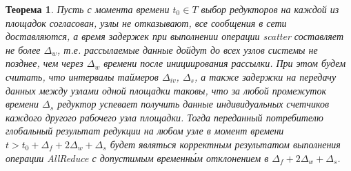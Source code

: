 \documentclass{article}
\theoremstyle{plain}
\newtheorem{theorem}{Теорема}[section]
\theoremstyle{plain}
\theoremstyle{plain}
\theoremstyle{plain}
\theoremstyle{definition}
\theoremstyle{remark}
\theoremstyle{plain}
\begin{document}
\begin{theorem}
\label{ConsistentStateCorrectness}
    Пусть с момента времени $t_0 \in T$ выбор редукторов на каждой из площадок согласован, узлы не отказывают, все сообщения в сети доставляются, а время задержек при выполнении операции scatter составляет не более $\Delta_w$, т.е. рассылаемые данные дойдут до всех узлов системы не позднее, чем через $\Delta_w$ времени после инициирования рассылки. При этом будем считать, что интервалы таймеров $\Delta_{iv}$, $\Delta_s$, а также задержки на передачу данных между узлами одной площадки таковы, что за любой промежуток времени $\Delta_s$ редуктор успевает получить данные индивидуальных счетчиков каждого другого рабочего узла площадки. Тогда переданный потребителю глобальный результат редукции на любом узле в момент времени $t > t_0 + \Delta_f + 2\Delta_w + \Delta_s$ будет являться корректным результатом выполнения операции AllReduce с допустимым временн\'{ы}м отклонением в $\Delta_f + 2\Delta_w + \Delta_s$.
\end{theorem}
\end{document}
